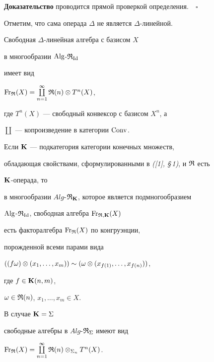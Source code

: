 {\bf Доказательство} проводится прямой проверкой определения.$\quad\square$


\medskip





Отметим, что сама операда $\Delta$ не является $\Delta$-линейной.








\begin{thm}\label{m1}


Свободная $\Delta$-линейная алгебра с базисом $X$ 


в многообразии $\Alg$-$\R_{\Id}$


имеет вид


$\Fr_{\R}(X)=\coprod\limits_{n=1}^{\infty} \R(n)\otimes T^n(X)$,


где $T^n(X)$ --- свободный конвексор с базисом $X^n$, а


$\coprod$ --- копроизведение в категории $\Conv$.


Если $\P$ --- подкатегория категории конечных множеств,


обладающая свойствами, сформулированными в {\em ([1], \S\,1)}, и $\R$ есть


$\P$-операда, то


в многообразии $Alg$-$\R_{\bold K}$, которое является подмногообразием


$\Alg$-$\R_{\Id}$, свободная алгебра $\Fr_{\R,{\bold K}}(X)$


есть факторалгебра $\Fr_{\R}(X)$ по конгруэнции,


порожденной всеми парами вида


$((f\o)\otimes (x_1,\dotsc, x_m)) \sim


(\o \otimes (x_{f(1)}, \dotsc,x_{f(n)}))$,


где $f\in \P(n,m)$,


$\o\in \R(n)$, $x_1,\dotsc, x_m\in X$.


В случае $\P=\sym$


свободные алгебры в $Alg$-$\R_{\sym}$ имеют вид


$\Fr_{\R}(X)=\coprod\limits_{n=1}^{\infty} \R(n)\otimes_{\sym_n} T^n(X)$.


\end{thm}





